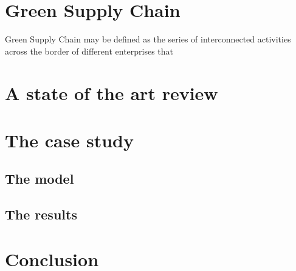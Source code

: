\documentclass{article}
\begin{document}
\section{Green Supply Chain}
Green Supply Chain may be defined as the series of interconnected activities across the border of different enterprises that 


\section{A state of the art review}

\section{The case study}
\subsection{The model}
\subsection{The results}

\section{Conclusion}
\end{document}
